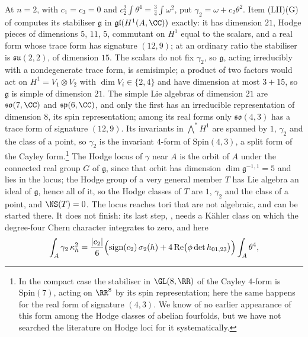 \begin{remark}[The exceptional ratio at $n=2$]\label{rem:p2primeexceptional}
At $n=2$, with $c_{1}=c_{3}=0$ and $c_{2}^{2}\int\theta^{4}=\frac34\int\omega^{2}$,
put $\gamma_{2}=\omega+c_{2}\theta^{2}$. Item (LII)(G) of
 computes its stabiliser $\mathfrak{g}$ in
$\mathfrak{gl}(H^{1}(A,\CC))$ exactly: it has dimension $21$, Hodge pieces of
dimensions $5$, $11$, $5$, commutant on $H^{1}$ equal to the scalars, and a
real form whose trace form has signature $(12,9)$; at an ordinary ratio the
stabiliser is $\mathfrak{su}(2,2)$, of dimension $15$. The scalars do not fix
$\gamma_{2}$, so $\mathfrak{g}$, acting irreducibly with a nondegenerate trace
form, is semisimple; a product of two factors would act on
$H^{1}=V_{1}\otimes V_{2}$ with $\dim V_{i}\in\{2,4\}$ and have dimension at
most $3+15$, so $\mathfrak{g}$ is simple of dimension $21$. The simple Lie
algebras of dimension $21$ are $\mathfrak{so}(7,\CC)$ and
$\mathfrak{sp}(6,\CC)$, and only the first has an irreducible representation
of dimension $8$, its spin representation; among its real forms only
$\mathfrak{so}(4,3)$ has a trace form of signature $(12,9)$. Its invariants in
$\bigwedge^{*}H^{1}$ are spanned by $1$, $\gamma_{2}$ and the class of a point,
so $\gamma_{2}$ is the invariant $4$-form of $\mathrm{Spin}(4,3)$, a split form
of the Cayley form.\footnote{In the compact case the stabiliser in
$\GL(8,\RR)$ of the Cayley $4$-form is $\mathrm{Spin}(7)$, acting on $\RR^{8}$
by its spin representation; here the same happens for the real form of
signature $(4,3)$. We know of no earlier appearance of this form among the
Hodge classes of abelian fourfolds, but we have not searched the literature on
Hodge loci for it systematically.} The Hodge locus of $\gamma$ near $A$ is the orbit of $A$
under the connected real group $G$ of $\mathfrak{g}$, since that orbit has
dimension $\dim\mathfrak{g}^{-1,1}=5$ and lies in the locus; the Hodge group
of a very general member $T$ has Lie algebra an ideal of $\mathfrak{g}$, hence
all of it, so the Hodge classes of $T$ are $1$, $\gamma_{2}$ and the class of a
point, and $\NS(T)=0$. The locus reaches tori that are not algebraic, and
 can be started there. It does not finish: its last step,
, needs a K\"ahler class on which the degree-four
Chern character integrates to zero, and here
\[
  \int_{A}\gamma_{2}\,\kappa_{h}^{2}
  =\frac{|c_{2}|}{6}\Bigl(\operatorname{sign}(c_{2})\,\sigma_{2}(h)
    +4\operatorname{Re}\bigl(\phi\det h_{01,23}\bigr)\Bigr)\int_{A}\theta^{4},
\]
\end{remark}
